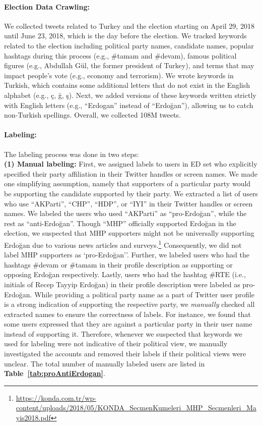 \documentclass[letterpaper]{article} \usepackage{aaai20}  \usepackage{times}  \usepackage{stackengine}
\begin{document}
\paragraph{\textbf{Election Data Crawling:}}\label{section_election_time_crawling}
We collected tweets related to Turkey and the election starting on April 29, 2018 until June 23, 2018, which is the day before the election. We tracked keywords related to the election including political party names, candidate names, popular hashtags during this process (e.g., \#tamam and \#devam), famous political figures (e.g., Abdullah G\"{u}l, the former president of Turkey), and terms that may impact people’s vote (e.g., economy and terrorism). We wrote keywords in Turkish, which contains some additional letters that do not exist in the English alphabet (e.g., \c{c}, \u{g}, \c{s}). Next, we added versions of these keywords written strictly with English letters (e.g., ``Erdogan'' instead of ``Erdo\u{g}an''), allowing us to catch non-Turkish spellings. Overall, we collected 108M tweets. 
\paragraph{\textbf{Labeling:}}\label{sec_labeling} 
The labeling process was done in two steps:\\
\textbf{(1) Manual labeling:} First, we assigned labels to users in ED set who explicitly specified their party affiliation in their Twitter handles or screen names. We made one simplifying assumption, namely that supporters of a particular party would be supporting the candidate supported by their party. We extracted a list of users who use ``AKParti'', ``CHP'', ``HDP'', or ``IYI'' in their Twitter handles or screen names. We labeled the users who used ``AKParti'' as ``pro-Erdo\u{g}an'', while the rest as ``anti-Erdo\u{g}an''. Though ``MHP'' officially supported Erdo\u{g}an in the election, we suspected that MHP supporters might not be universally supporting Erdo\u{g}an due to various news articles and surveys.\footnote{\url{https://konda.com.tr/wp-content/uploads/2018/05/KONDA_SecmenKumeleri_MHP_Secmenleri_Mayis2018.pdf}} Consequently, we did not label MHP supporters as `pro-Erdo\u{g}an''. 
Further, we labeled users who had the hashtags \#devam or \#tamam in their profile description as supporting or opposing Erdo\u{g}an respectively. Lastly, users who had the hashtag \#RTE (i.e., initials of Recep Tayyip Erdo\u{g}an) in their profile description were labeled as pro-Erdo\u{g}an. While providing a political party name as a part of Twitter user profile is a strong indication of supporting the respective party, we \emph{manually} checked all extracted names to ensure the correctness of labels. For instance, we found that some users expressed that they are against a particular party in their user name instead of supporting it. Therefore, whenever we suspected that keywords we used for labeling were not indicative of their political view, we manually investigated the accounts and removed their labels if their political views were unclear. The total number of manually labeled users are listed in \textbf{Table~\ref{tab:proAntiErdogan}}. 
\end{document}
